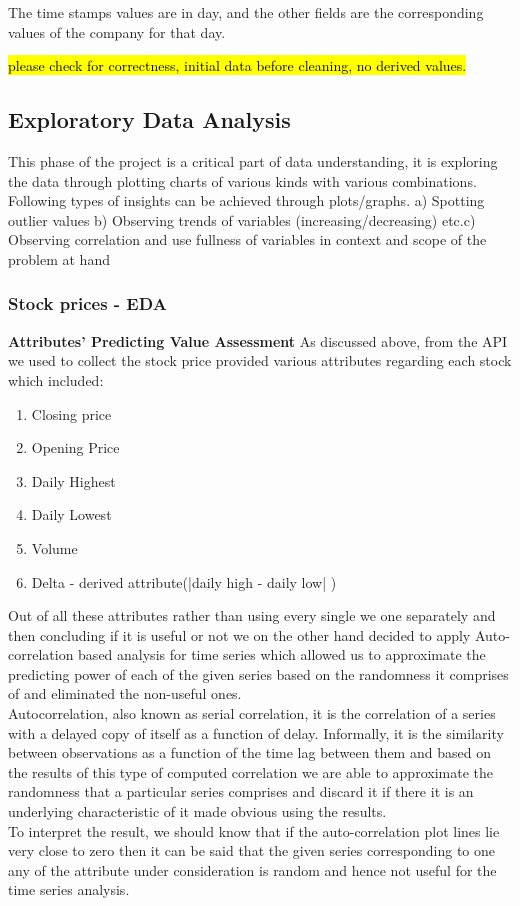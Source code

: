 \documentclass[sigconf, nonacm]{acmart}
\begin{document}
The time stamps values are in day, and the other fields are the corresponding values of the company for that day.

\hl{please check for correctness, initial data before cleaning, no derived values.}

\subsection{Exploratory Data Analysis} %
This phase of the project is a critical part of data understanding, it is exploring the data through plotting charts of various kinds with various combinations. Following types of insights can be achieved through plots/graphs. a) Spotting outlier values b)
Observing trends of variables (increasing/decreasing) etc.c) Observing correlation and use fullness of variables  in context and scope of the problem at hand


\subsubsection{Stock prices - EDA}
\textbf{Attributes' Predicting Value Assessment }
As discussed above, from the API we used to collect the stock price provided various attributes regarding each stock which included:
\begin{enumerate}
    \item Closing price
    \item Opening Price
    \item Daily Highest
    \item Daily Lowest
    \item Volume
    \item Delta - derived attribute(|daily high - daily low| )
\end{enumerate}
Out of all these attributes rather than using every single we one separately and then concluding if it is useful or not we on the other hand decided to apply Auto-correlation based analysis for time series which allowed us to approximate the predicting power of each of the given series based on the randomness it comprises of and eliminated the non-useful ones. 
\\Autocorrelation, also known as serial correlation, it is the correlation of a series with a delayed copy of itself as a function of delay. Informally, it is the similarity between observations as a function of the time lag between them and based on the results of this type of computed correlation we are able to approximate the randomness that a particular series comprises and discard it if there it is an underlying characteristic of it made obvious using the results.
\\ To interpret the result, we should know that if the auto-correlation plot lines lie very close to zero then it can be said that the given series corresponding to one any of the attribute under consideration is random and hence not useful for the time series analysis.
\end{document}
